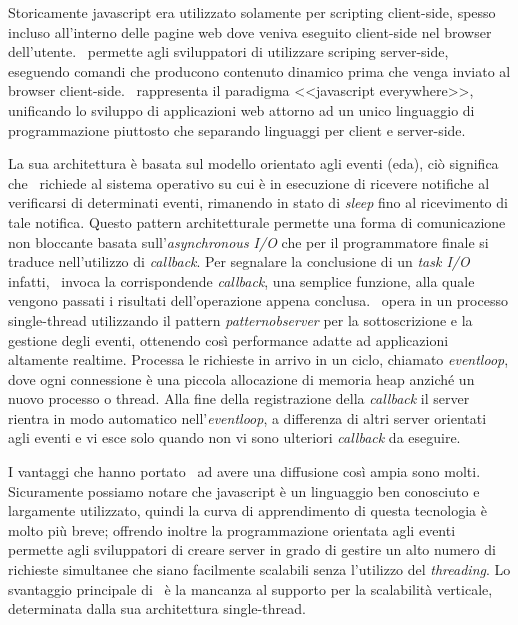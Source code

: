 \noindent
Storicamente \gls{javascript} era utilizzato solamente per scripting client-side, spesso incluso all'interno delle pagine web dove veniva eseguito client-side nel browser dell'utente. \nodejs~permette agli sviluppatori di utilizzare scriping server-side, eseguendo comandi che producono contenuto dinamico prima che venga inviato al browser client-side. \nodejs~rappresenta il paradigma <<\gls{javascript} everywhere>>\cite{jseverywhere}, unificando lo sviluppo di applicazioni web attorno ad un unico linguaggio di programmazione piuttosto che separando  linguaggi per client e server-side.

La sua architettura è basata sul modello orientato agli eventi (\acrshort{eda}), ciò significa che \nodejs~richiede al sistema operativo su cui è in esecuzione di ricevere notifiche al verificarsi di determinati eventi, rimanendo in stato di \textit{sleep} fino al ricevimento di tale notifica. Questo pattern architetturale permette una forma di comunicazione non bloccante basata sull'\textit{asynchronous I/O} che per il programmatore finale si traduce nell'utilizzo di \textit{\gls{callback}}. Per segnalare la conclusione di un \textit{task I/O} infatti, \nodejs~invoca la corrispondende \textit{\gls{callback}}, una semplice funzione, alla quale vengono passati i risultati dell'operazione appena conclusa.
\nodejs~opera in un processo single-thread utilizzando il pattern \textit{\acrshort{patternobserver}} per la sottoscrizione e la gestione degli eventi, ottenendo così performance adatte ad applicazioni altamente realtime. Processa le richieste in arrivo in un ciclo, chiamato \textit{\gls{eventloop}}, dove ogni connessione è una piccola allocazione di memoria heap anziché un nuovo processo o thread. Alla fine della registrazione della \textit{\gls{callback}} il server rientra in modo automatico nell'\textit{\gls{eventloop}}, a differenza di altri server orientati agli eventi e vi esce solo quando non vi sono ulteriori \textit{\gls{callback}} da eseguire.

I vantaggi che hanno portato \nodejs~ad avere una diffusione così ampia sono molti. Sicuramente possiamo notare che \gls{javascript} è un linguaggio ben conosciuto e largamente utilizzato, quindi la curva di apprendimento di questa tecnologia è molto più breve; offrendo inoltre la programmazione orientata agli eventi permette agli sviluppatori di creare server in grado di gestire un alto numero di richieste simultanee che siano facilmente scalabili senza l'utilizzo del \textit{threading}. Lo svantaggio principale di \nodejs~è la mancanza al supporto per la scalabilità verticale, determinata dalla sua architettura single-thread.

